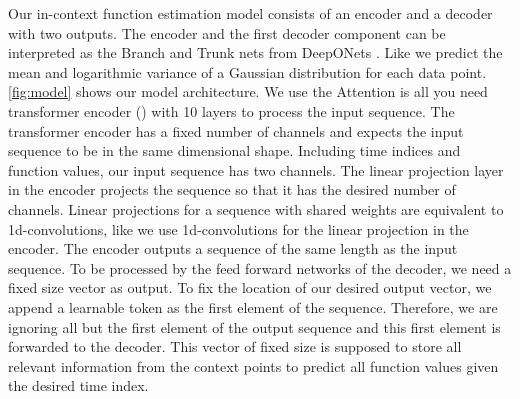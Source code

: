 \label{sec:model}
Our in-context function estimation model consists of an encoder and a decoder with two outputs. The encoder and the first decoder component can be interpreted as the Branch and Trunk nets from DeepONets \citet{Lu_2021}. Like \citet{seifner2025zeroshotimputationfoundationinference} we predict the mean and logarithmic variance of a Gaussian distribution for each data point. \autoref{fig:model} shows our model architecture. We use the Attention is all you need transformer encoder (\citet{vaswani2017attention}) with 10 layers to process the input sequence. The transformer encoder has a fixed number of channels and expects the input sequence to be in the same dimensional shape. Including time indices and function values, our input sequence has two channels. The linear projection layer in the encoder projects the sequence so that it has the desired number of channels. Linear projections for a sequence with shared weights are equivalent to 1d-convolutions, like \citet{vaswani2017attention} we use 1d-convolutions for the linear projection in the encoder. The encoder outputs a sequence of the same length as the input sequence. To be processed by the feed forward networks of the decoder, we need a fixed size vector as output. To fix the location of our desired output vector, we append a learnable token as the first element of the sequence. Therefore, we are ignoring all but the first element of the output sequence and this first element is forwarded to the decoder. This vector of fixed size is supposed to store all relevant information from the context points to predict all function values given the desired time index.

